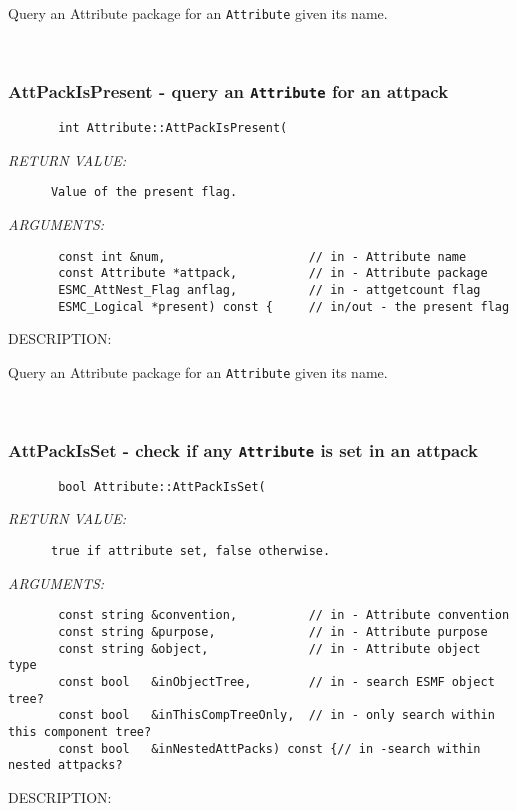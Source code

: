        Query an Attribute package for an {\tt Attribute} given its name.
   
 
\mbox{}\hrulefill\
 
\subsubsection [AttPackIsPresent] {AttPackIsPresent - query an {\tt Attribute} for an attpack}


  
\begin{verbatim}       int Attribute::AttPackIsPresent(\end{verbatim}{\em RETURN VALUE:}
\begin{verbatim}      Value of the present flag.\end{verbatim}{\em ARGUMENTS:}
\begin{verbatim}       const int &num,                    // in - Attribute name
       const Attribute *attpack,          // in - Attribute package
       ESMC_AttNest_Flag anflag,          // in - attgetcount flag
       ESMC_Logical *present) const {     // in/out - the present flag\end{verbatim}
{\sf DESCRIPTION:\\ }


       Query an Attribute package for an {\tt Attribute} given its name.
   
 
\mbox{}\hrulefill\
 
\subsubsection [AttPackIsSet] {AttPackIsSet - check if any {\tt Attribute} is set in an attpack}


  
\begin{verbatim}       bool Attribute::AttPackIsSet(
   \end{verbatim}{\em RETURN VALUE:}
\begin{verbatim}      true if attribute set, false otherwise.
   \end{verbatim}{\em ARGUMENTS:}
\begin{verbatim}       const string &convention,          // in - Attribute convention
       const string &purpose,             // in - Attribute purpose
       const string &object,              // in - Attribute object type
       const bool   &inObjectTree,        // in - search ESMF object tree?
       const bool   &inThisCompTreeOnly,  // in - only search within this component tree?
       const bool   &inNestedAttPacks) const {// in -search within nested attpacks?
   \end{verbatim}
{\sf DESCRIPTION:\\ }


